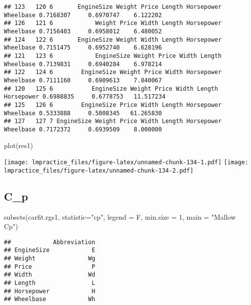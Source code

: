 \documentclass[
]{book}
\newenvironment{Shaded}{\begin{snugshade}}{\end{snugshade}}
\newcommand{\AttributeTok}[1]{\textcolor[rgb]{0.77,0.63,0.00}{#1}}
\newcommand{\DecValTok}[1]{\textcolor[rgb]{0.00,0.00,0.81}{#1}}
\newcommand{\FunctionTok}[1]{\textcolor[rgb]{0.00,0.00,0.00}{#1}}
\newcommand{\NormalTok}[1]{#1}
\newcommand{\StringTok}[1]{\textcolor[rgb]{0.31,0.60,0.02}{#1}}
\begin{document}
\begin{verbatim}
## 123   120 6       EngineSize Weight Price Length Horsepower Wheelbase 0.7168307     0.6970747    6.122202
## 126   121 6            Weight Price Width Length Horsepower Wheelbase 0.7156403     0.6958012    6.480052
## 124   122 6       EngineSize Weight Width Length Horsepower Wheelbase 0.7151475     0.6952740    6.628196
## 121   123 6            EngineSize Weight Price Width Length Wheelbase 0.7139831     0.6940284    6.978214
## 122   124 6        EngineSize Weight Price Width Horsepower Wheelbase 0.7111160     0.6909613    7.840067
## 120   125 6           EngineSize Weight Price Width Length Horsepower 0.6988835     0.6778753   11.517234
## 125   126 6        EngineSize Price Width Length Horsepower Wheelbase 0.5333888     0.5008345   61.265830
## 127   127 7 EngineSize Weight Price Width Length Horsepower Wheelbase 0.7172372     0.6939509    8.000000
\end{verbatim}

\begin{Shaded}
\begin{Highlighting}[]
\FunctionTok{plot}\NormalTok{(res1)}
\end{Highlighting}
\end{Shaded}

\texttt{[image: lmpractice\_files/figure-latex/unnamed-chunk-134-1.pdf]} \texttt{[image: lmpractice\_files/figure-latex/unnamed-chunk-134-2.pdf]}

\hypertarget{c_p}{%
\subsection{C\_p}\label{c_p}}

\begin{Shaded}
\begin{Highlighting}[]
\FunctionTok{subsets}\NormalTok{(carfit.rgs1, }\AttributeTok{statistic=}\StringTok{"cp"}\NormalTok{, }\AttributeTok{legend =}\NormalTok{ F, }\AttributeTok{min.size =} \DecValTok{1}\NormalTok{, }\AttributeTok{main =} \StringTok{"Mallow Cp"}\NormalTok{)}
\end{Highlighting}
\end{Shaded}

\begin{verbatim}
##            Abbreviation
## EngineSize            E
## Weight               Wg
## Price                 P
## Width                Wd
## Length                L
## Horsepower            H
## Wheelbase            Wh
\end{verbatim}
\end{document}
